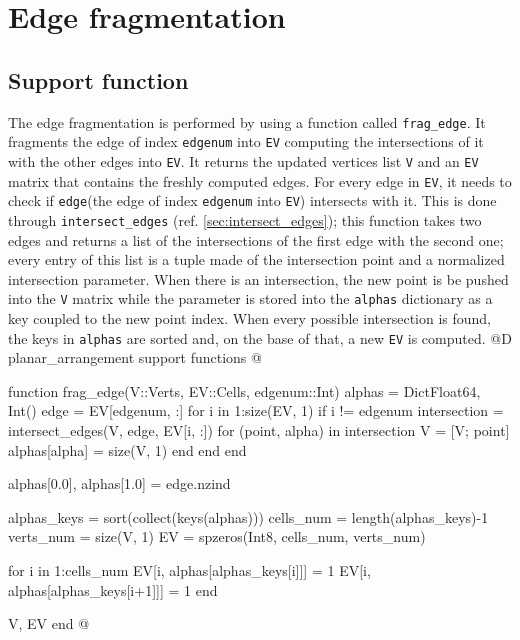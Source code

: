 \section{Edge fragmentation}
\subsection{Support function}
\label{sec:frag_edge}
The edge fragmentation is performed by using a function called \texttt{frag\_edge}.
It fragments the edge of index \texttt{edgenum} into \texttt{EV} computing the intersections of
it with the other edges into \texttt{EV}. It returns the updated vertices list \texttt{V} and an 
\texttt{EV} matrix that contains the freshly computed edges.
For every edge in \texttt{EV}, it needs to check if \texttt{edge}(the edge of index \texttt{edgenum} into 
\texttt{EV}) intersects with it. This is done through \texttt{intersect\_edges} (ref. \ref{sec:intersect_edges}); 
this function takes two edges and returns a list of the intersections of the first edge with the second one; 
every entry of this list is a tuple made of the intersection point and a normalized intersection parameter. 
When there is an intersection, the new point is be pushed into the \texttt{V} matrix while the parameter 
is stored into the \texttt{alphas} dictionary as a key coupled to the new point index.
When every possible intersection is found, the keys in \texttt{alphas} are sorted and, on the base of that,
a new \texttt{EV} is computed.
@D planar\_arrangement support functions
@{function frag_edge(V::Verts, EV::Cells, edgenum::Int)
    alphas = Dict{Float64, Int}()
    edge = EV[edgenum, :]
    for i in 1:size(EV, 1)
        if i != edgenum
            intersection = intersect_edges(V, edge, EV[i, :])
            for (point, alpha) in intersection
                V = [V; point]
                alphas[alpha] = size(V, 1)
            end
        end
    end

    alphas[0.0], alphas[1.0] = edge.nzind

    alphas_keys = sort(collect(keys(alphas)))
    cells_num = length(alphas_keys)-1
    verts_num = size(V, 1)
    EV = spzeros(Int8, cells_num, verts_num)

    for i in 1:cells_num
        EV[i, alphas[alphas_keys[i]]] = 1
        EV[i, alphas[alphas_keys[i+1]]] = 1
    end

    V, EV
end
@}
